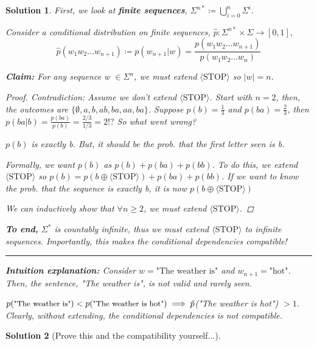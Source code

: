 \documentclass[12pt, twoside]{article}
\theoremstyle{spaceddefn}
\newtheorem{soln}{Solution}[section]
\begin{document}
\begin{soln}
First, we look at \textbf{finite sequences}, $\Sigma^{n*} \coloneqq \bigcup_{i=0}^{n} \Sigma^i$.

    Consider a conditional distribution on finite sequences, $\hat{p}:\Sigma^{n*} \times \Sigma \to [0,1], $ $$ \hat{p}(w_1w_2\dots
    w_{n+1})\coloneqq p(w_{n+1}|w)=\frac{p(w_1w_2\dots w_{n+1})}{p(w_1w_2 \dots w_{n})}$$

    \textbf{Claim:} For any sequence w $\in \Sigma^n$, we must extend $\langle \text{STOP} \rangle$ so $|w| = n$.
    \vspace{-0.2cm}
    \begin{proof}
        Contradiction: Assume we don't extend $\langle \text{STOP} \rangle$. Start with $n=2$, then, the outcomes are $\{\emptyset, a,b, ab, ba, aa, ba\}$. Suppose $p(b)=\frac{1}{3}$ and $p(ba)=\frac{2}{3}$, then $p(ba|b)= \frac{p(ba)}{p(b)}=\frac{2/3}{1/3}=2 !?$ So what went wrong?

         $p(b)$ is exactly b. But, it should be the prob. that the first letter seen is b.

        Formally, we want $p(b)$ as $p(b) + p(ba) +p(bb)$. To do this, we extend $\langle \text{STOP} \rangle$ so $p(b)=p(b \oplus \langle \text{STOP} \rangle)+p(ba)+p(bb)$. If we want to know the prob. that the sequence is exactly b, it is now $p(b \oplus \langle \text{STOP} \rangle)$

        We can inductively show that $\forall n \geq 2$, we must extend $\langle \text{STOP} \rangle$.
    \end{proof}
        \vspace{-0.2cm}
        \textbf{To end,} $\Sigma^*$ is countably infinite, thus we must extend $\langle \text{STOP} \rangle$ to infinite sequences. Importantly, this makes the conditional dependencies compatible!
    \vspace{0.0005cm}
    \hrule

     \textbf{Intuition explanation:} Consider $w = \text{"The weather is"}$ and $w_{n+1} = \text{"hot"}$. Then, the sentence, "The weather is", is not valid and rarely seen.

    $p(\text{\small"The weather is"}) < p(\text{\small"The weather is hot"}) \implies \tilde{p}$(\small"The weather is hot") $> 1$. \normalsize Clearly, without extending, the conditional dependencies is not compatible.

\end{soln}

\begin{soln}
    [Prove this and the compatibility yourself...]
\end{soln}
\end{document}
